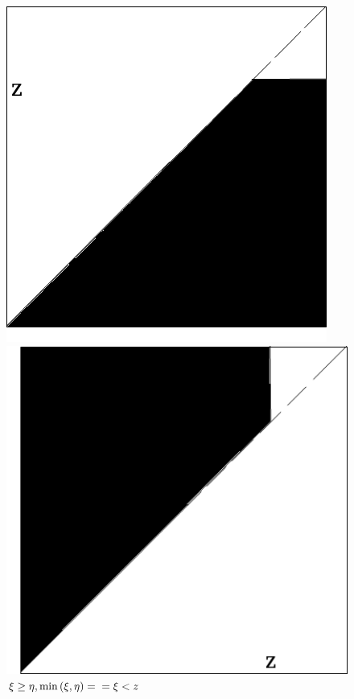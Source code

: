 \begin{enumerate}[label=\alph*)]
\begin{figure}[h!]
  \centering
  \begin{minipage}[b]{0.4\textwidth}
    \includegraphics[width=\textwidth]{./pictures/4_5.png}
    \caption{$ \xi < \eta, \min \left( \xi, \eta \right) = \\ = \eta < z$}
    \label{fig:45}
  \end{minipage}
  \hfill
  \begin{minipage}[b]{0.4\textwidth}
    \includegraphics[width=\textwidth]{./pictures/4_5_1.png}
    \caption{$ \xi \geq \eta, \min \left( \xi, \eta \right) = \\ = \xi < z$}
    \label{fig:451}
  \end{minipage}
\end{figure}


\end{enumerate}
